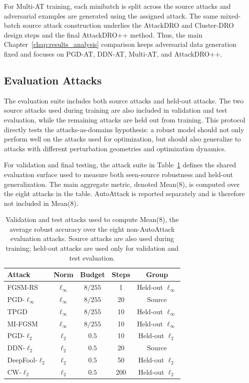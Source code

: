 For Multi-AT training, each minibatch is split across the source attacks and adversarial examples are generated using the assigned attack. The same mixed-batch source attack construction underlies the AttackDRO and Cluster-DRO design steps and the final AttackDRO++ method. Thus, the main Chapter~\ref{chap:results_analysis} comparison keeps adversarial data generation fixed and focuses on PGD-AT, DDN-AT, Multi-AT, and AttackDRO++.

\subsection{Evaluation Attacks}
\label{subsec:ch5_evaluation_attacks}

The evaluation suite includes both source attacks and held-out attacks. The two source
attacks used during training are also included in validation and test evaluation, while
the remaining attacks are held out from training. This protocol directly tests the
attacks-as-domains hypothesis: a robust model should not only perform well on the attacks
used for optimization, but should also generalize to attacks with different perturbation
geometries and optimization dynamics.


For validation and final testing, the attack suite in
Table~\ref{tab:ch5_evaluation_attacks} defines the shared evaluation surface used to
measure both seen-source robustness and held-out generalization. The main aggregate
metric, denoted Mean(8), is computed over the eight attacks in the table. AutoAttack is
reported separately and is therefore not included in Mean(8).
\begin{table}[H]
\centering
\caption[Validation and test attacks]{Validation and test attacks used to compute Mean(8), the average robust accuracy over the eight non-AutoAttack evaluation attacks. Source attacks are also used during training; held-out attacks are used only for validation and test evaluation.}
\label{tab:ch5_evaluation_attacks}
\renewcommand{\arraystretch}{1.08}
\setlength{\tabcolsep}{7pt}
\begin{tabular}{lcccc}
\toprule
Attack & Norm & Budget & Steps & Group \\
\midrule
FGSM-RS              & $\ell_\infty$ & $8/255$ & 1   & Held-out $\ell_\infty$ \\
PGD-$\ell_\infty$   & $\ell_\infty$ & $8/255$ & 20  & Source \\
TPGD                 & $\ell_\infty$ & $8/255$ & 10  & Held-out $\ell_\infty$ \\
MI-FGSM              & $\ell_\infty$ & $8/255$ & 10  & Held-out $\ell_\infty$ \\
PGD-$\ell_2$         & $\ell_2$      & $0.5$   & 10  & Held-out $\ell_2$ \\
DDN-$\ell_2$         & $\ell_2$      & $0.5$   & 20  & Source \\
DeepFool-$\ell_2$    & $\ell_2$      & $0.5$   & 50  & Held-out $\ell_2$ \\
CW-$\ell_2$          & $\ell_2$      & $0.5$   & 200 & Held-out $\ell_2$ \\
\bottomrule
\end{tabular}
\end{table}

